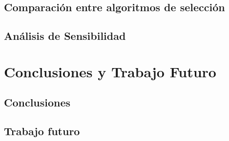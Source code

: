 \documentclass[12pt,a4paper]{book}
\begin{document}
\section{Comparación entre algoritmos de selección} \label{Subsec: 5_3}



\section{Análisis de Sensibilidad} \label{Subsec: 5_4}




\chapter{Conclusiones y Trabajo Futuro} \label{Capítulo 6}



\section{Conclusiones} \label{Subsec: 6_1}



\section{Trabajo futuro} \label{Subsec: 6_2}



  
\newpage

\medskip
\nocite{*}


\clearpage

\newpage

\appendix
\end{document}
